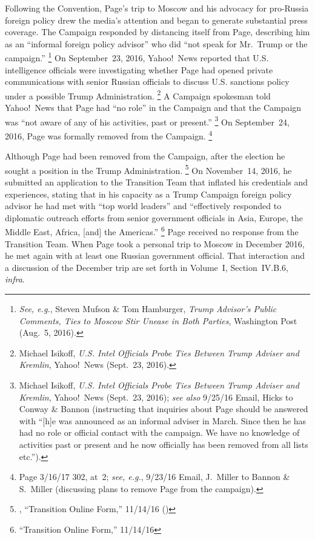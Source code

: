 Following the Convention, Page's trip to Moscow and his advocacy for pro-Russia foreign policy drew the media's attention and began to generate substantial press coverage.
The Campaign responded by distancing itself from Page, describing him as an ``informal foreign policy advisor'' who did ``not speak for Mr.~Trump or the campaign.''%
\footnote{\textit{See, e.g.}, Steven Mufson \& Tom Hamburger, \textit{Trump Advisor's Public Comments, Ties to Moscow Stir Unease in Both Parties}, Washington Post (Aug.~5, 2016).}
On September~23, 2016, Yahoo!\ News reported that U.S. intelligence officials were investigating whether Page had opened private communications with senior Russian officials to discuss U.S. sanctions policy under a possible Trump Administration.%
\footnote{Michael Isikoff, \textit{U.S. Intel Officials Probe Ties Between Trump Adviser and Kremlin}, Yahoo!\ News (Sept.~23, 2016).}
A Campaign spokesman told Yahoo!\ News that Page had ``no role'' in the Campaign and that the Campaign was ``not aware of any of his activities, past or present.''%
\footnote{Michael Isikoff, \textit{U.S. Intel Officials Probe Ties Between Trump Adviser and Kremlin}, Yahoo!\ News (Sept.~23, 2016);
\textit{see also} 9/25/16 Email, Hicks to Conway \& Bannon (instructing that inquiries about Page should be answered with ``[h]e was announced as an informal adviser in March.
Since then he has had no role or official contact with the campaign.
We have no knowledge of activities past or present and he now officially has been removed from all lists etc.'').}
On September~24, 2016, Page was formally removed from the Campaign.%
\footnote{Page 3/16/17 302, at~2;
\textit{see, e.g.}, 9/23/16 Email, J.~Miller to Bannon \& S.~Miller (discussing plans to remove Page from the campaign).}

Although Page had been removed from the Campaign, after the election he sought a position in the Trump Administration.%
\footnote{, ``Transition Online Form,'' 11/14/16 ()}
On November~14, 2016, he submitted an application to the Transition Team that inflated his credentials and experiences, stating that in his capacity as a Trump Campaign foreign policy advisor he had met with ``top world leaders'' and ``effectively responded to diplomatic outreach efforts from senior government officials in Asia, Europe, the Middle East, Africa, [and] the Americas.''%
\footnote{ ``Transition Online Form,'' 11/14/16 }
Page received no response from the Transition Team.
When Page took a personal trip to Moscow in December 2016, he met again with at least one Russian government official.
That interaction and a discussion of the December trip are set forth in Volume~I, Section~IV.B.6, \textit{infra}.

